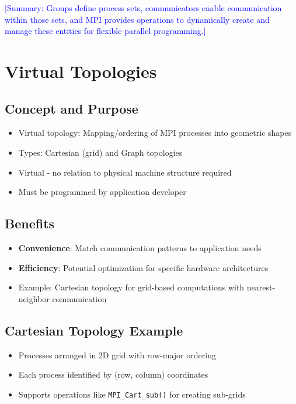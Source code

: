 \documentclass[12pt]{article}
\begin{document}
\textcolor{blue}{[Summary: Groups define process sets, communicators enable communication within those sets, and MPI provides operations to dynamically create and manage these entities for flexible parallel programming.]}

\section{Virtual Topologies}

\subsection{Concept and Purpose}
\begin{itemize}
    \item Virtual topology: Mapping/ordering of MPI processes into geometric shapes
    \item Types: Cartesian (grid) and Graph topologies
    \item Virtual - no relation to physical machine structure required
    \item Must be programmed by application developer
\end{itemize}

\subsection{Benefits}
\begin{itemize}
    \item \textbf{Convenience}: Match communication patterns to application needs
    \item \textbf{Efficiency}: Potential optimization for specific hardware architectures
    \item Example: Cartesian topology for grid-based computations with nearest-neighbor communication
\end{itemize}

\subsection{Cartesian Topology Example}
\begin{itemize}
    \item Processes arranged in 2D grid with row-major ordering
    \item Each process identified by (row, column) coordinates
    \item Supports operations like \texttt{MPI\_Cart\_sub()} for creating sub-grids
\end{itemize}
\end{document}
